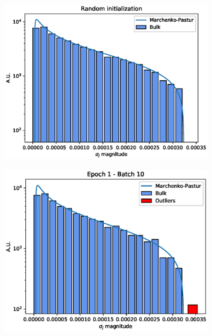 \documentclass{revtex4-1}
\begin{document}
\begin{figure}
  \centering
  \begin{subfigure}{.45\linewidth}
    \includegraphics[width=\linewidth]{mp_fit.eps}
    \caption{}
    \label{fig:mp_fit}
  \end{subfigure}
  \begin{subfigure}{.45\linewidth}
    \includegraphics[width=\linewidth]{sv_distr_e1_b10.eps}
    \caption{}
    \label{fig:sv1}
  \end{subfigure}\par\medskip
  \begin{subfigure}{.45\linewidth}

\end{subfigure}
\end{figure}
\end{document}
